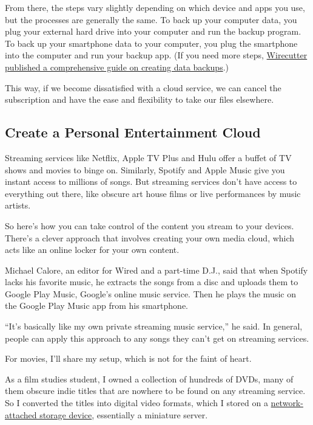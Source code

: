 From there, the steps vary slightly depending on which device and apps
you use, but the processes are generally the same. To back up your
computer data, you plug your external hard drive into your computer and
run the backup program. To back up your smartphone data to your
computer, you plug the smartphone into the computer and run your backup
app. (If you need more steps,
\href{https://thewirecutter.com/reviews/how-to-back-up-your-computer/\#create-local-windows-backups-with-file-history}{Wirecutter
published a comprehensive guide on creating data backups}.)

This way, if we become dissatisfied with a cloud service, we can cancel
the subscription and have the ease and flexibility to take our files
elsewhere.

\hypertarget{create-a-personal-entertainment-cloud}{%
\subsection{Create a Personal Entertainment
Cloud}\label{create-a-personal-entertainment-cloud}}

Streaming services like Netflix, Apple TV Plus and Hulu offer a buffet
of TV shows and movies to binge on. Similarly, Spotify and Apple Music
give you instant access to millions of songs. But streaming services
don't have access to everything out there, like obscure art house films
or live performances by music artists.

So here's how you can take control of the content you stream to your
devices. There's a clever approach that involves creating your own media
cloud, which acts like an online locker for your own content.

Michael Calore, an editor for Wired and a part-time D.J., said that when
Spotify lacks his favorite music, he extracts the songs from a disc and
uploads them to Google Play Music, Google's online music service. Then
he plays the music on the Google Play Music app from his smartphone.

``It's basically like my own private streaming music service,'' he said.
In general, people can apply this approach to any songs they can't get
on streaming services.

For movies, I'll share my setup, which is not for the faint of heart.

As a film studies student, I owned a collection of hundreds of DVDs,
many of them obscure indie titles that are nowhere to be found on any
streaming service. So I converted the titles into digital video formats,
which I stored on a
\href{https://thewirecutter.com/reviews/best-network-attached-storage/}{network-attached
storage device}, essentially a miniature server.

